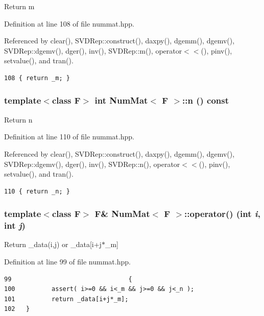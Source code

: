 Return m 

Definition at line 108 of file nummat.hpp.

Referenced by clear(), SVDRep::construct(), daxpy(), dgemm(), dgemv(), SVDRep::dgemv(), dger(), inv(), SVDRep::m(), operator$<$$<$(), pinv(), setvalue(), and tran().

\footnotesize\begin{verbatim}108 { return _m; }
\end{verbatim}\normalsize 


\subsubsection{\setlength{\rightskip}{0pt plus 5cm}template$<$class F$>$ int {\bf Num\-Mat}$<$ F $>$::n () const\hspace{0.3cm}{\tt  [inline]}}\label{classNumMat_611a0b095fab035a528671dd8cf7f3b7_611a0b095fab035a528671dd8cf7f3b7}


Return n 

Definition at line 110 of file nummat.hpp.

Referenced by clear(), SVDRep::construct(), daxpy(), dgemm(), dgemv(), SVDRep::dgemv(), dger(), inv(), SVDRep::n(), operator$<$$<$(), pinv(), setvalue(), and tran().

\footnotesize\begin{verbatim}110 { return _n; }
\end{verbatim}\normalsize 


\subsubsection{\setlength{\rightskip}{0pt plus 5cm}template$<$class F$>$ F\& {\bf Num\-Mat}$<$ F $>$::operator() (int {\em i}, int {\em j})\hspace{0.3cm}{\tt  [inline]}}\label{classNumMat_743eed4071652374b372885106b9142f_743eed4071652374b372885106b9142f}


Return \_\-data(i,j) or \_\-data[i+j$\ast$\_\-m] 

Definition at line 99 of file nummat.hpp.

\footnotesize\begin{verbatim}99                                { 
100          assert( i>=0 && i<_m && j>=0 && j<_n );
101          return _data[i+j*_m];
102   }
\end{verbatim}\normalsize 


